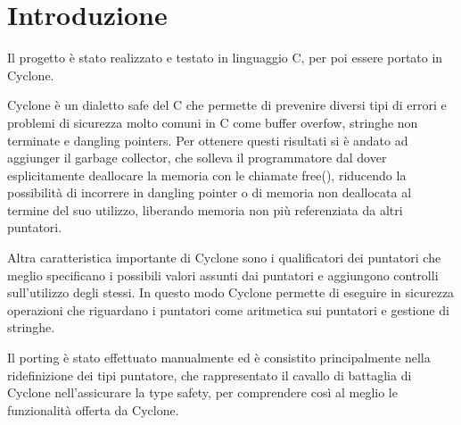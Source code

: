 \section{Introduzione}
Il progetto è stato realizzato e testato in linguaggio C, per poi essere portato in Cyclone.

Cyclone è un dialetto safe del C che permette di prevenire diversi tipi di errori e problemi di
sicurezza molto comuni in C come buffer overfow, stringhe non terminate e dangling pointers.
Per ottenere questi risultati si è andato ad aggiunger il garbage
collector, che solleva il programmatore dal dover esplicitamente deallocare la memoria con le
chiamate free(), riducendo la possibilità di incorrere in dangling pointer o di memoria non
deallocata al termine del suo utilizzo, liberando memoria non più referenziata da altri puntatori.

Altra caratteristica importante di Cyclone sono i qualificatori dei puntatori che meglio
specificano i possibili valori assunti dai puntatori e aggiungono controlli sull'utilizzo degli stessi.
In questo modo Cyclone permette di eseguire in sicurezza operazioni che riguardano i puntatori
come aritmetica sui puntatori e gestione di stringhe.

Il porting è stato effettuato manualmente ed è consistito principalmente nella
ridefinizione dei tipi puntatore, che rappresentato il cavallo di battaglia di Cyclone
nell’assicurare la type safety, per comprendere così al meglio le funzionalità offerta da Cyclone.

